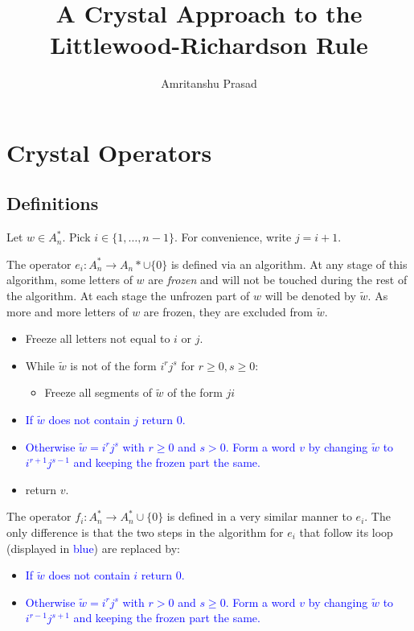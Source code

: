 \documentclass[12pt]{amsart}
\title{A Crystal Approach to the Littlewood-Richardson Rule}
\author{Amritanshu Prasad}
\newcommand{\bc}[1]{\textcolor{blue}{#1}}
\theoremstyle{definition}
\theoremstyle{example}
\begin{document}
\section{Crystal Operators}
\subsection{Definitions}
Let $w\in A_n^*$.
Pick $i\in \{1,\dotsc,n-1\}$.
For convenience, write $j=i+1$.

The operator $e_i:A_n^*\to A_n*\cup\{0\}$ is defined via an algorithm.
At any stage of this algorithm, some letters of $w$ are \emph{frozen} and will not be touched during the rest of the algorithm.
At each stage the unfrozen part of $w$ will be denoted by $\tilde w$.
As more and more letters of $w$ are frozen, they are excluded from $\tilde w$.
\begin{itemize}
\item Freeze all letters not equal to $i$ or $j$.
\item While $\tilde w$ is not of the form $i^rj^s$ for $r\geq 0, s\geq 0$:
  \begin{itemize}
  \item Freeze all segments of $\tilde w$ of the form $ji$
  \end{itemize}
\item \bc{If $\tilde w$ does not contain $j$ return $0$.}
\item \bc{Otherwise $\tilde w=i^rj^s$ with $r\geq 0$ and $s>0$.
  Form a word $v$ by changing $\tilde w$ to $i^{r+1}j^{s-1}$ and keeping the frozen part the same.}
\item return $v$.
\end{itemize}

The operator $f_i:A_n^*\to A_n^*\cup\{0\}$ is defined in a very similar manner to $e_i$.
The only difference is that the two steps in the algorithm for $e_i$ that follow its loop (displayed in \bc{blue}) are replaced by:
\begin{itemize}
\item \bc{If $\tilde w$ does not contain $i$ return $0$.}
\item \bc{Otherwise $\tilde w=i^rj^s$ with $r> 0$ and $s\geq 0$.
  Form a word $v$ by changing $\tilde w$ to $i^{r-1}j^{s+1}$ and keeping the frozen part the same.}
\end{itemize}
\end{document}
